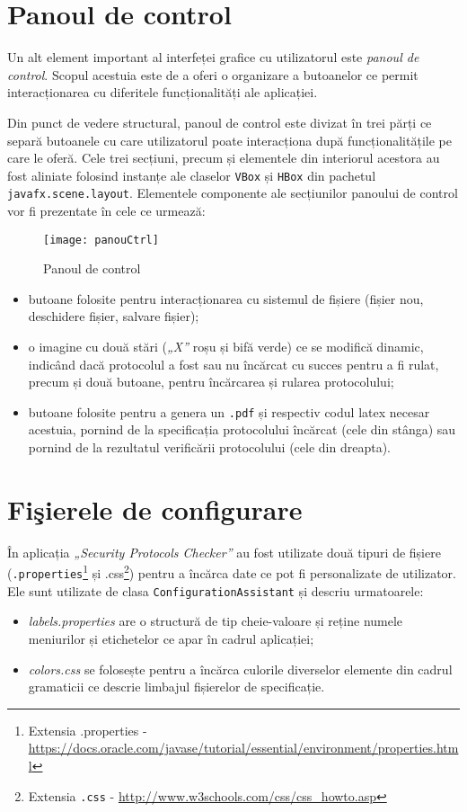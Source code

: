 \section{Panoul de control}
Un alt element important al interfeței grafice cu utilizatorul este \textit{panoul de control}. Scopul acestuia este de a oferi o organizare a butoanelor ce permit interacționarea cu diferitele funcționalități ale aplicației.
\par
Din punct de vedere structural, panoul de control este divizat în trei părți ce separă butoanele cu care utilizatorul poate interacționa după funcționalitățile pe care le oferă. Cele trei secțiuni, precum și elementele din interiorul acestora au fost aliniate folosind instanțe ale claselor \texttt{VBox} și \texttt{HBox} din pachetul \texttt{javafx.scene.layout}. Elementele componente ale secțiunilor panoului de control vor fi prezentate în cele ce urmează:
\begin{wrapfigure}{r}{0.3\textwidth}
	\centering
	\texttt{[image: panouCtrl]}
    \caption{Panoul de control}
    \label{fig:panouControl}
\end{wrapfigure}
\begin{itemize}
\item butoane folosite pentru interacționarea cu sistemul de fișiere (fișier nou, deschidere fișier, salvare fișier);
\item o imagine cu două stări (\textit{„X”} roșu și bifă verde) ce se modifică dinamic, indicând dacă protocolul a fost sau nu încărcat cu succes pentru a fi rulat, precum și două butoane, pentru încărcarea și rularea protocolului;
\item butoane folosite pentru a genera un \texttt{.pdf} și respectiv codul latex necesar acestuia, pornind de la specificația protocolului încărcat (cele din stânga) sau pornind de la rezultatul verificării protocolului (cele din dreapta).
\end{itemize}
\section{Fişierele de configurare}
În aplicația \textit{„Security Protocols Checker”} au fost utilizate două tipuri de fișiere (\texttt{.properties}\footnote{Extensia .properties - \url{https://docs.oracle.com/javase/tutorial/essential/environment/properties.html}} și .css\footnote{Extensia \texttt{.css} - \url{http://www.w3schools.com/css/css_howto.asp}}) pentru a încărca date ce pot fi personalizate de utilizator. Ele sunt utilizate de clasa \texttt{ConfigurationAssistant} și descriu urmatoarele:
\begin{itemize}
\item \textit{labels.properties} are o structură de tip cheie-valoare și reține numele meniurilor și etichetelor ce apar în cadrul aplicației;
\item \textit{colors.css} se folosește pentru a încărca culorile diverselor elemente din cadrul gramaticii ce descrie limbajul fișierelor de specificație.
\end{itemize}
\newpage
